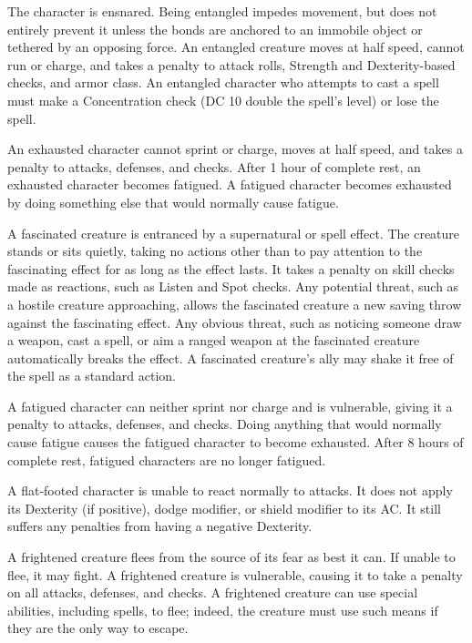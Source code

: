  The character is ensnared. Being entangled impedes movement, but does not entirely prevent it unless the bonds are anchored to an immobile object or tethered by an opposing force. An entangled creature moves at half speed, cannot run or charge, and takes a  penalty to attack rolls, Strength and Dexterity-based checks, and armor class. An entangled character who attempts to cast a spell must make a Concentration check (DC 10 \add double the spell's level) or lose the spell.

 An exhausted character cannot sprint or charge, moves at half speed, and takes a  penalty to attacks, defenses, and checks. After 1 hour of complete rest, an exhausted character becomes fatigued. A fatigued character becomes exhausted by doing something else that would normally cause fatigue.

 A fascinated creature is entranced by a supernatural or spell effect. The creature stands or sits quietly, taking no actions other than to pay attention to the fascinating effect for as long as the effect lasts. It takes a  penalty on skill checks made as reactions, such as Listen and Spot checks. Any potential threat, such as a hostile creature approaching, allows the fascinated creature a new saving throw against the fascinating effect. Any obvious threat, such as noticing someone draw a weapon, cast a spell, or aim a ranged weapon at the fascinated creature automatically breaks the effect. A fascinated creature's ally may shake it free of the spell as a standard action.

 A fatigued character can neither sprint nor charge and is vulnerable, giving it a  penalty to attacks, defenses, and checks. Doing anything that would normally cause fatigue causes the fatigued character to become exhausted. After 8 hours of complete rest, fatigued characters are no longer fatigued.

 A flat-footed character is unable to react normally to attacks. It does not apply its Dexterity (if positive), dodge modifier, or shield modifier to its AC. It still suffers any penalties from having a negative Dexterity.

 A frightened creature flees from the source of its fear as best it can. If unable to flee, it may fight. A frightened creature is vulnerable, causing it to take a  penalty on all attacks, defenses, and checks. A frightened creature can use special abilities, including spells, to flee; indeed, the creature must use such means if they are the only way to escape.

